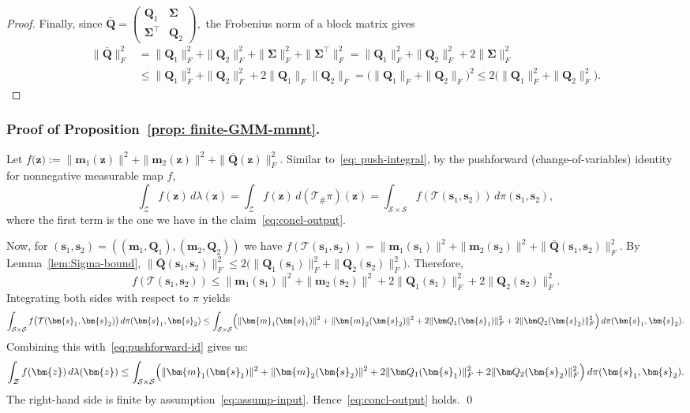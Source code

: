 \documentclass[opre,sglanonrev]{informs4}
\newcommand{\mT}{\mathcal{T}}
\newcommand{\mZ}{\mathcal{Z}}
\newcommand{\mS}{\mathcal{S}}
\newcommand{\bmean}{\bm{m}}
\newcommand{\bs}{\bm{s}}
\newcommand{\bz}{\bm{z}}
\newcommand{\bQ}{\bm Q}
\newcommand{\bSigma}{\bm{\Sigma}}
\begin{document}
{\begin{APPENDICES}
\begin{proof}
Finally, since $\bar{\bQ}
=
\begin{pmatrix}
\bQ_1 & \bSigma\\
\bSigma^\top & \bQ_2
\end{pmatrix},$ the Frobenius norm of a block matrix gives
\begin{align*}
    \|\bar{\bQ}\|_F^2 &=
\|\bQ_1\|_F^2
+
\|\bQ_2\|_F^2
+
\|\bSigma\|_F^2
+
\|\bSigma^\top\|_F^2 =
\|\bQ_1\|_F^2
+
\|\bQ_2\|_F^2
+
2\|\bSigma\|_F^2 \\
&\le
\|\bQ_1\|_F^2
+
\|\bQ_2\|_F^2
+
2\|\bQ_1\|_F\|\bQ_2\|_F=
\bigl(
\|\bQ_1\|_F+\|\bQ_2\|_F
\bigr)^2 \leq 2\bigl(
\|\bQ_1\|_F^2+\|\bQ_2\|_F^2
\bigr).
\end{align*}
\end{proof}


\subsubsection{Proof of Proposition~\ref{prop: finite-GMM-mmnt}.}
Let $f\bigl(\bz\bigr)
:=\|\bmean_1(\bz)\|^2+\|\bmean_2(\bz)\|^2+\|\bar{\bQ}(\bz)\|_F^2.$
Similar to~\eqref{eq: push-integral}, by the pushforward (change-of-variables) identity for nonnegative measurable map $f$,
\begin{equation}\label{eq:pushforward-id}
\int_{\mZ} f(\bz)\,d \lambda(\bz) = \int_{\mZ} f(\bz)\,d(\mT_\#\pi)(\bz)
=\int_{\mS\times \mS} f(\mT(\bs_1,\bs_2))\,d\pi(\bs_1,\bs_2),
\end{equation}
where the first term is the one we have in the claim~\eqref{eq:concl-output}.

Now, for $(\bs_1,\bs_2)=((\bmean_1,\bQ_1),(\bmean_2,\bQ_2))$ we have
$f(\mT(\bs_1,\bs_2))=\|\bmean_1(\bs_1)\|^2+\|\bmean_2(\bs_2)\|^2+\|\bar{\bQ}(\bs_1, \bs_2)\|_F^2$.
By Lemma~\ref{lem:Sigma-bound}, $\|\bar{\bQ}(\bs_1, \bs_2)\|_F^2 \le 2\bigl(\|\bQ_1(\bs_1)\|_F^2+\|\bQ_2(\bs_2)\|_F^2\bigr).$
Therefore,
\[
f(\mT(\bs_1,\bs_2))
\le
\|\bmean_1(\bs_1)\|^2+\|\bmean_2(\bs_2)\|^2
+2\|\bQ_1(\bs_1)\|_F^2+2\|\bQ_2(\bs_2)\|_F^2.
\]
Integrating both sides with respect to $\pi$ yields
\[
\int_{\mS\times\mS} f\bigl(\mT(\bs_1, \bs_2)\bigr) \, d\pi(\bs_1, \bs_2)
\le
\int_{\mS\times\mS}
\Bigl(\|\bmean_1(\bs_1)\|^2+\|\bmean_2(\bs_2)\|^2+2\|\bQ_1(\bs_1)\|_F^2+2\|\bQ_2(\bs_2)\|_F^2\Bigr)\,d\pi(\bs_1, \bs_2).
\]
Combining this with~\eqref{eq:pushforward-id} gives us:
\[
\int_{\mZ} f(\bz)\,d\lambda(\bz)
\le
\int_{\mS\times\mS}
\Bigl(\|\bmean_1(\bs_1)\|^2+\|\bmean_2(\bs_2)\|^2+2\|\bQ_1(\bs_1)\|_F^2+2\|\bQ_2(\bs_2)\|_F^2\Bigr)\,d\pi(\bs_1, \bs_2).
\]
The right-hand side is finite by assumption~\eqref{eq:assump-input}. Hence~\eqref{eq:concl-output} holds. \hfill \qed


\end{APPENDICES}}
\end{document}
